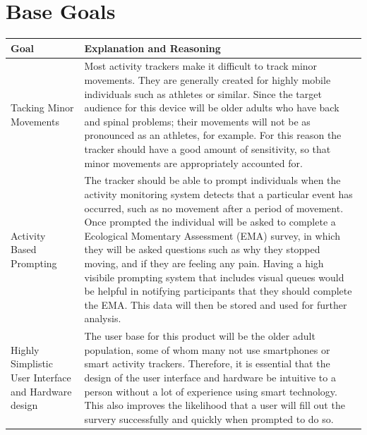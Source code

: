 \documentclass[12pt]{article}
\begin{document}
\section{Base Goals}
\begin{center}
    \begin{tabular}{ | m{7em} | m{32em}| }
        \hline
        \textbf{Goal}                                    & \textbf{Explanation and Reasoning}                                                                                                                                                                                                                                                                                                                                                                                                                                                                                                                                                               \\
        \hline
        Tacking Minor Movements                          & Most activity trackers make it difficult to track minor movements.
        They are generally created for highly mobile individuals such as athletes or similar. Since the target audience for this device will be older adults who have back and spinal problems; their movements will not be as pronounced as an athletes, for example. For this reason the tracker should have a good amount of sensitivity, so that minor movements are appropriately accounted for.                                                                                                                                                                                                                                                       \\
        \hline
        Activity Based Prompting                            & The tracker should be able to prompt individuals when the activity monitoring system detects that a particular event has occurred, such as no movement after a period of movement.  Once prompted the individual will be asked to complete a Ecological Momentary Assessment (EMA) survey, in which they will be asked questions such as why they stopped moving, and if they are feeling any pain. Having a high visibile prompting system that includes visual queues would be helpful in notifying participants that they should complete the EMA. This data will then be stored and used for further analysis. \\
        \hline
        Highly \linebreak Simplistic User Interface and Hardware design & The user base for this product will be the older adult population, some of whom many not use smartphones or smart activity trackers. Therefore, it is essential that the design of the user interface and hardware be intuitive to a person without a lot of experience using smart technology. This also improves the likelihood that a user will fill out the survery successfully and quickly when prompted to do so.                                                                                                                                                                         \\

\end{tabular}
\end{center}
\end{document}
